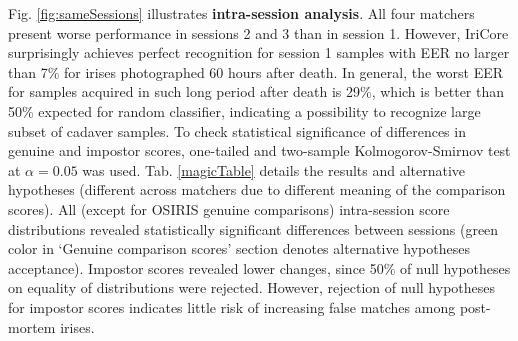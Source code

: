 \documentclass[10pt,twocolumn,letterpaper]{article}
\begin{document}
Fig. \ref{fig:sameSessions} illustrates {\bf intra-session analysis}. All four matchers present worse performance in sessions 2 and 3 than in session 1. However, IriCore surprisingly achieves perfect recognition for session 1 samples with EER no larger than 7\% for irises photographed 60 hours after death. In general, the worst EER for samples acquired in such long period after death is 29\%, which is better than 50\% expected for random classifier, indicating a possibility to recognize large subset of cadaver samples. To check statistical significance of differences in genuine and impostor scores, one-tailed and two-sample Kolmogorov-Smirnov test at $\alpha=0.05$ was used. Tab. \ref{magicTable} details the results and alternative hypotheses (different across matchers due to different meaning of the comparison scores). All (except for OSIRIS genuine comparisons) intra-session score distributions revealed statistically significant differences between sessions (green color in `Genuine comparison scores' section denotes alternative hypotheses acceptance). Impostor scores revealed lower changes, since 50\% of null hypotheses on equality of distributions were rejected. However, rejection of null hypotheses for impostor scores indicates little risk of increasing false matches among post-mortem irises.



%
%
%
%
%
%
%
\end{document}
